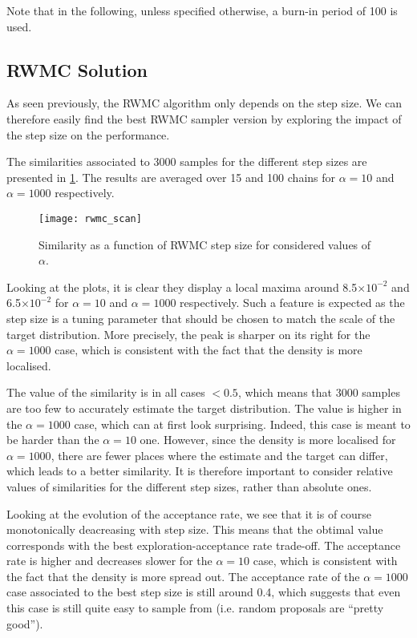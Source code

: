 \documentclass[a4paper, 12pt,oneside]{article}
\begin{document}
		Note that in the following, unless specified otherwise, a burn-in period of 100 is used. 
		\subsection{RWMC Solution}
			As seen previously, the RWMC algorithm only depends on the step size. We can therefore easily find the best RWMC sampler version by exploring the impact of the step size on the performance. 

			The similarities associated to 3000 samples for the different step sizes are presented in \ref{fig:rwmc-scan}. The results are averaged over 15 and 100 chains for $\alpha=10$ and $\alpha=1000$ respectively. 
			\begin{figure}[htb]
				\centering
					\vspace{0em}
					\texttt{[image: rwmc\_scan]}
					\caption{Similarity as a function of RWMC step size for considered values of $\alpha$.}
					\label{fig:rwmc-scan}
			\end{figure}
			Looking at the plots, it is clear they display a local maxima around 8.5$\times 10^{-2}$ and 6.5$\times 10^{-2}$ for $\alpha=10$ and $\alpha=1000$ respectively. Such a feature is expected as the step size is a tuning parameter that should be chosen to match the scale of the target distribution.
			More precisely, the peak is sharper on its right for the $\alpha=1000$ case, which is consistent with the fact that the density is more localised. 
			
			The value of the similarity is in all cases $<0.5$, which means that 3000 samples are too few to accurately estimate the target distribution. The value is higher in the $\alpha=1000$ case, which can at first look surprising. Indeed, this case is meant to be harder than the $\alpha=10$ one. However, since the density is more localised for $\alpha=1000$, there are fewer places where the estimate and the target can differ, which leads to a better similarity. It is therefore important to consider relative values of similarities for the different step sizes, rather than  absolute ones.

			Looking at the evolution of the acceptance rate, we see that it is of course monotonically deacreasing with step size. This means that the obtimal value corresponds with the best exploration-acceptance rate trade-off. The acceptance rate is higher and decreases slower for the $\alpha=10$ case, which is consistent with the fact that the density is more spread out. The acceptance rate of the $\alpha=1000$ case associated to the best step size is still around 0.4, which suggests that even this case is still quite easy to sample from (i.e. random proposals are ``pretty good''). 
\end{document}
